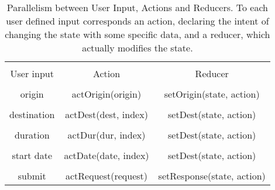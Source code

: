 \begin{table}[]
  \centering
  \caption{Parallelism between User Input, Actions and Reducers. To each user defined input corresponds an 
  action, declaring the intent of changing the state with some specific data, and a reducer, which actually modifies the state. }
  \setlength{\tabcolsep}{8mm}
  \label{table:input_action_reducer}
  \begin{tabular}{ccc}
  \hline
  \\[-0.75em]
  User input  & Action               & Reducer                    \\ \hline
  \\[-0.75em]
  origin      & actOrigin(origin)    & setOrigin(state, action)   \\
  \\[-0.75em]
  destination & actDest(dest, index) & setDest(state, action)     \\
  \\[-0.75em]
  duration    & actDur(dur, index)   & setDest(state, action)     \\
  \\[-0.75em]
  start date  & actDate(date, index) & setDest(state, action)     \\
  \\[-0.75em]
  submit      & actRequest(request)  & setResponse(state, action) \\ \hline
  \end{tabular}
\end{table}






